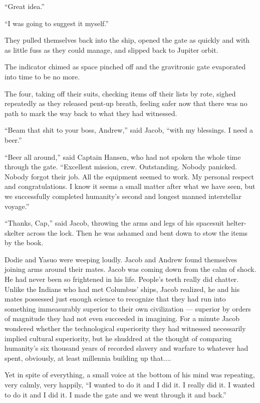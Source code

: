 \documentclass[english,11pt,letterpaper,onecolumn]{scrbook}
\begin{document}
	``Great idea.''

	``I was going to suggest it myself.''

	They pulled themselves back into the ship, opened the gate as quickly and with as little fuss as they could manage, and slipped back to Jupiter orbit.

	The indicator chimed as space pinched off and the gravitronic gate evaporated into time to be no more.

	The four, taking off their suits, checking items off their lists by rote, sighed repeatedly as they released pent-up breath, feeling safer now that there was no path to mark the way back to what they had witnessed.

	``Beam that shit to your boss, Andrew,'' said Jacob, ``with my blessings.  I need a beer.''

	``Beer all around,'' said Captain Hansen, who had not spoken the whole time through the gate.  ``Excellent mission, crew.  Outstanding.  Nobody panicked.  Nobody forgot their job.  All the equipment seemed to work.  My personal respect and congratulations.  I know it seems a small matter after what we have seen, but we successfully completed humanity's second and longest manned interstellar voyage.''

	``Thanks, Cap,'' said Jacob, throwing the arms and legs of his spacesuit helter-skelter across the lock.  Then he was ashamed and bent down to stow the items by the book.

	Dodie and Yasuo were weeping loudly.  Jacob and Andrew found themselves joining arms around their mates.  Jacob was coming down from the calm of shock.  He had never been so frightened in his life.  People's teeth really did chatter.  Unlike the Indians who had met Columbus' ships, Jacob realized, he and his mates possessed just enough science to recognize that they had run into something immeasurably superior to their own civilization --- superior by orders of magnitude they had not even succeeded in imagining.  For a minute Jacob wondered whether the technological superiority they had witnessed necessarily implied cultural superiority, but he shuddred at the thought of comparing humanity's six thousand years of recorded slavery and warfare to whatever had spent, obviously, at least millennia building up that....

	Yet in spite of everything, a small voice at the bottom of his mind was repeating, very calmly, very happily, ``I wanted to do it and I did it.  I really did it.  I wanted to do it and I did it.  I made the gate and we went through it and back.''
\end{document}
